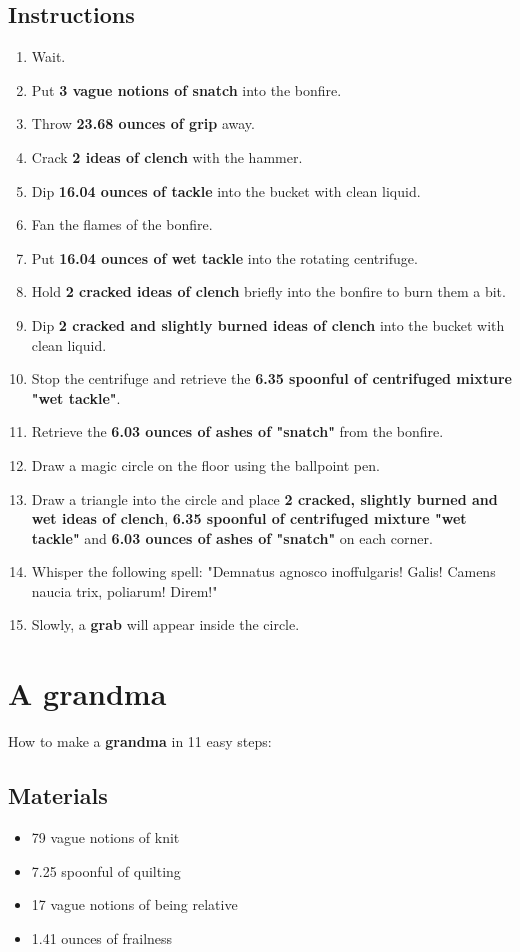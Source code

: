 \documentclass{article}
\begin{document}
\subsection{Instructions}\begin{enumerate}
\item 
Wait.
\item 
Put \textbf{3 vague notions of snatch} into the bonfire.
\item 
Throw \textbf{23.68 ounces of grip} away.
\item 
Crack \textbf{2 ideas of clench} with the hammer.
\item 
Dip \textbf{16.04 ounces of tackle} into the bucket with clean liquid.
\item 
Fan the flames of the bonfire.
\item 
Put \textbf{16.04 ounces of wet tackle} into the rotating centrifuge.
\item 
Hold \textbf{2 cracked ideas of clench} briefly into the bonfire to burn them a bit.
\item 
Dip \textbf{2 cracked and slightly burned ideas of clench} into the bucket with clean liquid.
\item 
Stop the centrifuge and retrieve the \textbf{6.35 spoonful of centrifuged mixture "wet tackle"}.
\item 
Retrieve the \textbf{6.03 ounces of ashes of "snatch"} from the bonfire.
\item 
Draw a magic circle on the floor using the ballpoint pen.
\item 
Draw a triangle into the circle and place \textbf{2 cracked, slightly burned and wet ideas of clench}, \textbf{6.35 spoonful of centrifuged mixture "wet tackle"} and \textbf{6.03 ounces of ashes of "snatch"} on each corner.
\item 
Whisper the following spell: "Demnatus agnosco inoffulgaris! Galis! Camens naucia trix, poliarum! Direm!"
\item 
Slowly, a \textbf{grab} will appear inside the circle.
\end{enumerate}
\newpage
\section{A grandma}How to make a \textbf{grandma} in 11 easy steps:

\subsection{Materials}\begin{itemize}
\item 
79 vague notions of knit
\item 
7.25 spoonful of quilting
\item 
17 vague notions of being relative
\item 
1.41 ounces of frailness
\end{itemize}
\end{document}
